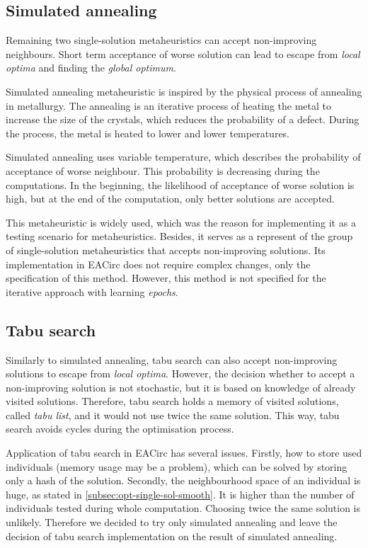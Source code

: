 \documentclass[
  print, %
  Table,   %
  nolof,     %
  nolot,     %
  11pt, %
  oneside  %
]{fithesis3}
\begin{document}
\subsection{Simulated annealing}
\label{subsec:opt-single-sol-sa}

Remaining two single-solution metaheuristics can accept non-improving neighbours. Short term acceptance of worse solution can lead to escape from \textit{local optima} and finding the \textit{global optimum}.

Simulated annealing metaheuristic is inspired by the physical process of annealing in metallurgy. The annealing is an iterative process of heating the metal to increase the size of the crystals, which reduces the probability of a defect. During the process, the metal is heated to lower and lower temperatures.

Simulated annealing uses variable temperature, which describes the probability of acceptance of worse neighbour. This probability is decreasing during the computations. In the beginning, the likelihood of acceptance of worse solution is high, but at the end of the computation, only better solutions are accepted.

This metaheuristic is widely used, which was the reason for implementing it as a testing scenario for metaheuristics. Besides, it serves as a represent of the group of single-solution metaheuristics that accepts non-improving solutions. Its implementation in EACirc does not require complex changes, only the specification of this method. However, this method is not specified for the iterative approach with learning \textit{epochs}.

\subsection{Tabu search}
\label{subsec:opt-single-sol-tabu}

Similarly to simulated annealing, tabu search can also accept non-improving solutions to escape from \textit{local optima}. However, the decision whether to accept a non-improving solution is not stochastic, but it is based on knowledge of already visited solutions. Therefore, tabu search holds a memory of visited solutions, called \textit{tabu list}, and it would not use twice the same solution. This way, tabu search avoids cycles during the optimisation process.

Application of tabu search in EACirc has several issues. Firstly, how to store used individuals (memory usage may be a problem), which can be solved by storing only a hash of the solution. Secondly, the neighbourhood space of an individual is huge, as stated in \cref{subsec:opt-single-sol-smooth}. It is higher than the number of individuals tested during whole computation. Choosing twice the same solution is unlikely. Therefore we decided to try only simulated annealing and leave the decision of tabu search implementation on the result of simulated annealing.
\end{document}
